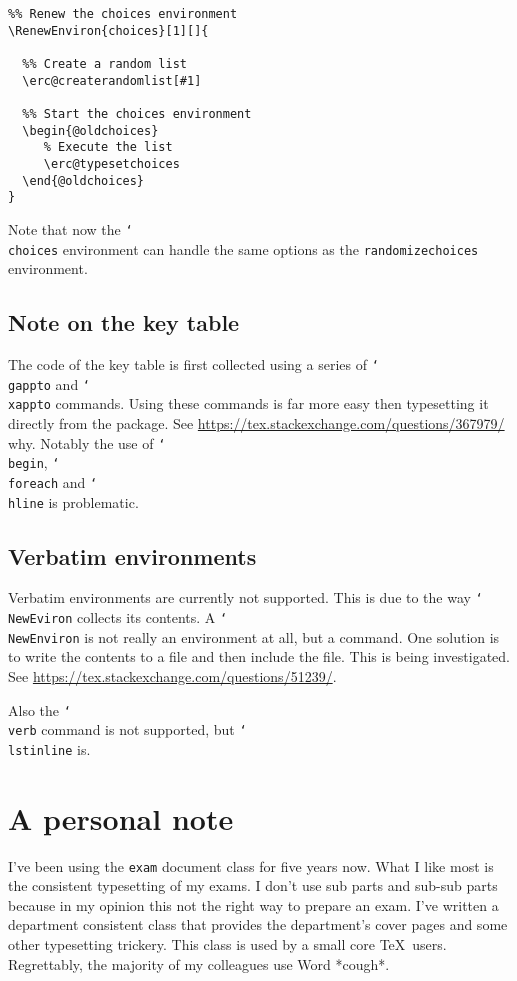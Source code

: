 \documentclass[12pt,a4paper]{exam}
\providecommand{\texorpdfstring}[2]{#1}
\newcommand{\bs}{\texorpdfstring{\char`\\}{}}
\begin{document}
\begin{lstlisting}
%% Renew the choices environment
\RenewEnviron{choices}[1][]{

  %% Create a random list
  \erc@createrandomlist[#1]

  %% Start the choices environment
  \begin{@oldchoices}
     % Execute the list
     \erc@typesetchoices
  \end{@oldchoices}
}
\end{lstlisting}

Note that now the \texttt{\bs choices} environment can handle the same options as the
\texttt{randomizechoices} environment.

\subsection{Note on the key table}
The code of the key table is first collected using a series of \texttt{\bs gappto} and
\texttt{\bs xappto} commands. Using these commands is far more easy then typesetting it
directly from the package. See \url{https://tex.stackexchange.com/questions/367979/}
why. Notably the use of \texttt{\bs begin}, \texttt{\bs foreach} and \texttt{\bs hline}
is problematic.

\subsection{Verbatim environments}
Verbatim environments are currently not supported. This is due to the way \texttt{\bs NewEviron}
collects its contents. A \texttt{\bs NewEnviron} is not really an environment at all, but a
command. One solution is to write the contents to a file and then include the file. This is
being investigated. See
\url{https://tex.stackexchange.com/questions/51239/}.

Also the \texttt{\bs verb} command is not supported, but \texttt{\bs lstinline} is.

\section{A personal note}
I've been using the \texttt{exam} document class for five years now. What I like most
is the consistent typesetting of my exams. I don't use sub parts and sub-sub parts
because in my opinion this not the right way to prepare an exam. I've written a
department consistent class that provides the department's cover pages and some
other typesetting trickery. This class is used by a small core \TeX\ users. Regrettably,
the majority of my colleagues use Word *cough*.
\end{document}
